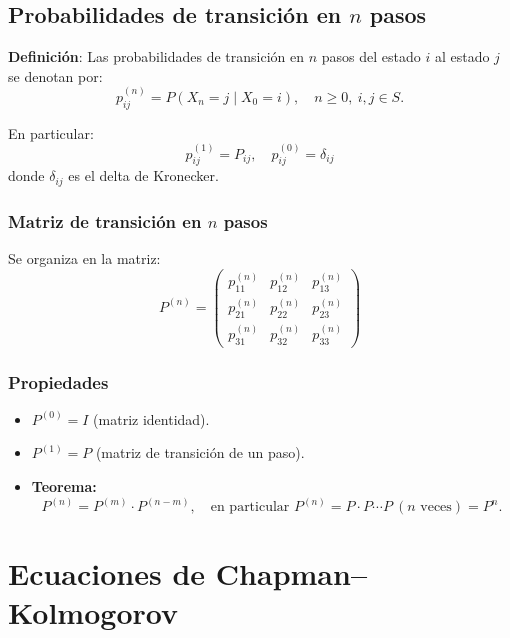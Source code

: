 \documentclass[12pt,a4paper]{article}
\begin{document}
\subsection*{Probabilidades de transición en $n$ pasos}

\textbf{Definición}: Las probabilidades de transición en $n$ pasos del estado $i$ al estado $j$ se denotan por:
\begin{equation*}
p_{ij}^{(n)} = P(X_n = j \mid X_0 = i), \quad n \geq 0, \ i, j \in S.
\end{equation*}

En particular:
\begin{equation*}
p_{ij}^{(1)} = P_{ij}, \quad p_{ij}^{(0)} = \delta_{ij}
\end{equation*}
donde $\delta_{ij}$ es el delta de Kronecker.

\subsubsection*{Matriz de transición en $n$ pasos}
Se organiza en la matriz:
\begin{equation*}
P^{(n)} =
\begin{pmatrix}
p_{11}^{(n)} & p_{12}^{(n)} & p_{13}^{(n)} \\
p_{21}^{(n)} & p_{22}^{(n)} & p_{23}^{(n)} \\
p_{31}^{(n)} & p_{32}^{(n)} & p_{33}^{(n)}
\end{pmatrix}
\end{equation*}

\subsubsection*{Propiedades}
\begin{itemize}
    \item $P^{(0)} = I$ (matriz identidad).
    \item $P^{(1)} = P$ (matriz de transición de un paso).
    \item \textbf{Teorema:}  
    \begin{equation*}
    P^{(n)} = P^{(m)} \cdot P^{(n-m)}, \quad \text{en particular } P^{(n)} = P \cdot P \cdots P \ (\text{$n$ veces}) = P^n.
    \end{equation*}
\end{itemize}

\section*{Ecuaciones de Chapman--Kolmogorov}
\end{document}
